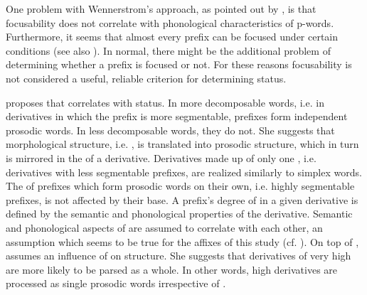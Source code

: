 One problem with Wennerstrom's approach, as pointed out by \citet[161f.]{Raffelsiefen.1999}, is that focusability does not correlate with phonological characteristics of p-words. Furthermore, it seems that almost every prefix can be focused under certain conditions (see also \citealt[chapter 4]{Plag.2003}). In normal,  there might be the additional problem of determining whether a prefix is focused or not. For these reasons focusability is not considered a useful, reliable criterion for determining  status.

\cite{Raffelsiefen.1999} proposes that  correlates with  status. In more decomposable words, i.e. in derivatives in which the prefix is more segmentable, prefixes form independent prosodic words. In less decomposable words, they do not.
She suggests that morphological structure, i.e. , is translated into prosodic structure, which in turn is mirrored in the  of a derivative. Derivatives made up of only one , i.e. derivatives with less segmentable prefixes, are realized similarly to simplex words. The  of prefixes which form prosodic words on their own, i.e. highly segmentable prefixes, is not affected by their base. 
A prefix's degree of  in a given derivative is defined by the semantic and phonological properties of the derivative. 
Semantic and phonological aspects of  are assumed to correlate with each other, an assumption which seems to be true for the affixes of this study (cf. ). On top of , \citet[175f.]{Raffelsiefen.1999} assumes an influence of  on  structure. 
She suggests that derivatives of very high  are more likely to be parsed as a whole. In other words, high  derivatives are processed as single prosodic words irrespective of .


